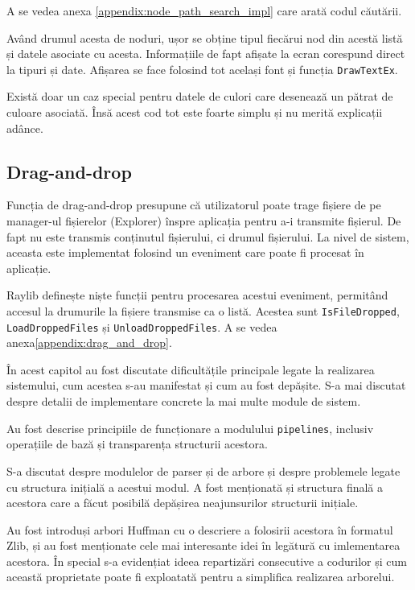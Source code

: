 \documentclass[a4paper,12pt]{report}
\begin{document}
A se vedea anexa \ref{appendix:node_path_search_impl} care arată codul căutării.

Având drumul acesta de noduri, ușor se obține tipul fiecărui
nod din acestă listă și datele asociate cu acesta.
Informațiile de fapt afișate la ecran corespund direct la tipuri și date.
Afișarea se face folosind tot același font și funcția \texttt{DrawTextEx}.

Există doar un caz special pentru datele de culori care desenează un pătrat de culoare asociată.
Însă acest cod tot este foarte simplu și nu merită explicații adânce.

\subsection{Drag-and-drop}

Funcția de drag-and-drop presupune că utilizatorul poate trage fișiere
de pe manager-ul fișierelor (Explorer) înspre aplicația pentru a-i transmite fișierul.
De fapt nu este transmis conținutul fișierului, ci drumul fișierului.
La nivel de sistem, aceasta este implementat folosind un eveniment care poate fi procesat în aplicație.

Raylib definește niște funcții pentru procesarea acestui eveniment,
permitând accesul la drumurile la fișiere transmise ca o listă.
Acestea sunt \texttt{IsFileDropped}, \texttt{LoadDroppedFiles} și \texttt{UnloadDroppedFiles}.
A se vedea anexa\ref{appendix:drag_and_drop}.


În acest capitol au fost discutate dificultățile principale legate la realizarea sistemului,
cum acestea s-au manifestat și cum au fost depășite.
S-a mai discutat despre detalii de implementare concrete la mai multe module de sistem.

Au fost descrise principiile de funcționare a modulului \texttt{pipelines},
inclusiv operațiile de bază și transparența structurii acestora.

S-a discutat despre modulelor de parser și de arbore
și despre problemele legate cu structura inițială a acestui modul.
A fost menționată și structura finală a acestora care
a făcut posibilă depășirea neajunsurilor structurii inițiale.

Au fost introduși arbori Huffman cu o descriere a folosirii acestora în formatul Zlib,
și au fost menționate cele mai interesante idei în legătură cu imlementarea acestora.
În special s-a evidențiat ideea repartizări consecutive a codurilor și cum această proprietate poate fi
exploatată pentru a simplifica realizarea arborelui.
\end{document}
